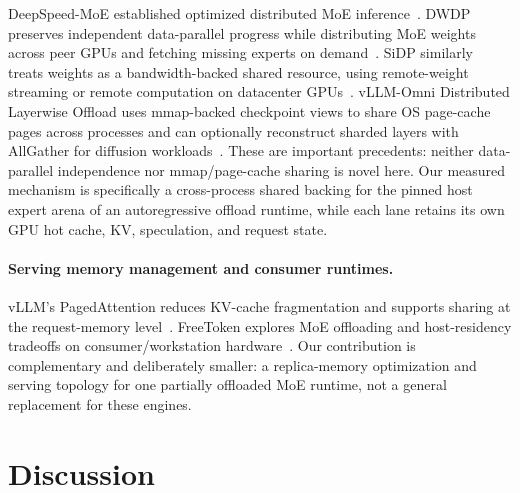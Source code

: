 DeepSpeed-MoE established optimized distributed MoE inference~\cite{deepspeedmoe}. DWDP preserves independent data-parallel progress while distributing MoE weights across peer GPUs and fetching missing experts on demand~\cite{dwdp}. SiDP similarly treats weights as a bandwidth-backed shared resource, using remote-weight streaming or remote computation on datacenter GPUs~\cite{sidp}. vLLM-Omni Distributed Layerwise Offload uses mmap-backed checkpoint views to share OS page-cache pages across processes and can optionally reconstruct sharded layers with AllGather for diffusion workloads~\cite{vllmomni}. These are important precedents: neither data-parallel independence nor mmap/page-cache sharing is novel here. Our measured mechanism is specifically a cross-process shared backing for the pinned host expert arena of an autoregressive offload runtime, while each lane retains its own GPU hot cache, KV, speculation, and request state.

\paragraph{Serving memory management and consumer runtimes.}
vLLM's PagedAttention reduces KV-cache fragmentation and supports sharing at the request-memory level~\cite{vllm}. FreeToken explores MoE offloading and host-residency tradeoffs on consumer/workstation hardware~\cite{freetoken}. Our contribution is complementary and deliberately smaller: a replica-memory optimization and serving topology for one partially offloaded MoE runtime, not a general replacement for these engines.
\section{Discussion}
